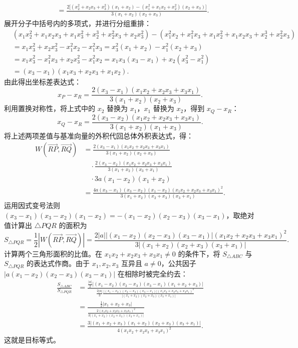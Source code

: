 \begin{solution}
\begin{align*}
&= \frac{2 \big[ (x_2^2 + x_2x_3 + x_3^2)(x_1 + x_2) - (x_1^2 + x_1x_2 + x_2^2)(x_2 + x_3) \big]}{3(x_1 + x_2)(x_2 + x_3)}.
\end{align*}
展开分子中括号内的多项式，并进行分组重排：
\begin{align*}
&(x_1x_2^2 + x_1x_2x_3 + x_1x_3^2 + x_2^3 + x_2^2x_3 + x_2x_3^2) - (x_1^2x_2 + x_1^2x_3 + x_1x_2^2 + x_1x_2x_3 + x_2^3 + x_2^2x_3) \\
&= x_1x_3^2 + x_2x_3^2 - x_1^2x_2 - x_1^2x_3 = x_3^2(x_1 + x_2) - x_1^2(x_2 + x_3) \\
&= x_1x_3^2 - x_1^2x_3 + x_2x_3^2 - x_1^2x_2 = x_1x_3(x_3 - x_1) + x_2(x_3^2 - x_1^2) \\
&= (x_3 - x_1)(x_1x_3 + x_2x_3 + x_1x_2).
\end{align*}
由此得出坐标差表达式：
\[ x_P - x_R = \frac{2(x_3 - x_1)(x_1x_2 + x_2x_3 + x_3x_1)}{3(x_1 + x_2)(x_2 + x_3)}. \]
利用置换对称性，将上式中的 $x_2$ 替换为 $x_1$，$x_1$ 替换为 $x_2$，得到 $x_Q - x_R$：
\[ x_Q - x_R = \frac{2(x_3 - x_2)(x_1x_2 + x_2x_3 + x_3x_1)}{3(x_1 + x_2)(x_1 + x_3)}. \]
将上述两项差值与基准向量的外积代回总体外积表达式，得：
\begin{align*}
W(\overrightarrow{RP}, \overrightarrow{RQ})
&= \frac{2(x_3 - x_1)(x_1x_2 + x_2x_3 + x_3x_1)}{3(x_1 + x_2)(x_2 + x_3)} \\
&\quad \cdot \frac{2(x_3 - x_2)(x_1x_2 + x_2x_3 + x_3x_1)}{3(x_1 + x_2)(x_3 + x_1)} \\
&\quad \cdot 3a(x_1 - x_2)(x_1 + x_2) \\
&= \frac{4a(x_3 - x_1)(x_3 - x_2)(x_1 - x_2)(x_1x_2 + x_2x_3 + x_3x_1)^2}{3(x_1 + x_2)(x_2 + x_3)(x_3 + x_1)}.
\end{align*}
运用因式变号法则 $(x_3 - x_1)(x_3 - x_2)(x_1 - x_2) = -(x_1 - x_2)(x_2 - x_3)(x_3 - x_1)$，取绝对值计算出 $\triangle PQR$ 的面积为
\[ S_{\triangle PQR} = \frac{1}{2} \left| W(\overrightarrow{RP}, \overrightarrow{RQ}) \right| = \frac{2|a| \left| (x_1 - x_2)(x_2 - x_3)(x_3 - x_1) \right| (x_1x_2 + x_2x_3 + x_3x_1)^2}{3 \left| (x_1 + x_2)(x_2 + x_3)(x_3 + x_1) \right|}. \]
计算两个三角形面积的比值。在 $x_1x_2 + x_2x_3 + x_3x_1 \neq 0$ 的条件下，将 $S_{\triangle ABC}$ 与 $S_{\triangle PQR}$ 的表达式作商。由于 $x_1, x_2, x_3$ 互异且 $a \neq 0$，公共因子 $|a(x_1 - x_2)(x_2 - x_3)(x_3 - x_1)|$ 在相除时被完全约去：
\begin{align*}
\frac{S_{\triangle ABC}}{S_{\triangle PQR}} &= \frac{\frac{|a|}{2} \left| (x_1 - x_2)(x_2 - x_3)(x_3 - x_1)(x_1 + x_2 + x_3) \right|}{\frac{2|a|}{3} \frac{\left| (x_1 - x_2)(x_2 - x_3)(x_3 - x_1) \right| (x_1x_2 + x_2x_3 + x_3x_1)^2}{\left| (x_1 + x_2)(x_2 + x_3)(x_3 + x_1) \right|}} \\
&= \frac{ \frac{1}{2} \left| x_1 + x_2 + x_3 \right| }{ \frac{2(x_1x_2 + x_2x_3 + x_3x_1)^2}{3 \left| (x_1 + x_2)(x_2 + x_3)(x_3 + x_1) \right|} } \\
&= \frac{3 \left| (x_1 + x_2 + x_3)(x_1 + x_2)(x_2 + x_3)(x_3 + x_1) \right|}{4(x_1x_2 + x_2x_3 + x_3x_1)^2}.
\end{align*}
这就是目标等式。
\end{solution}


